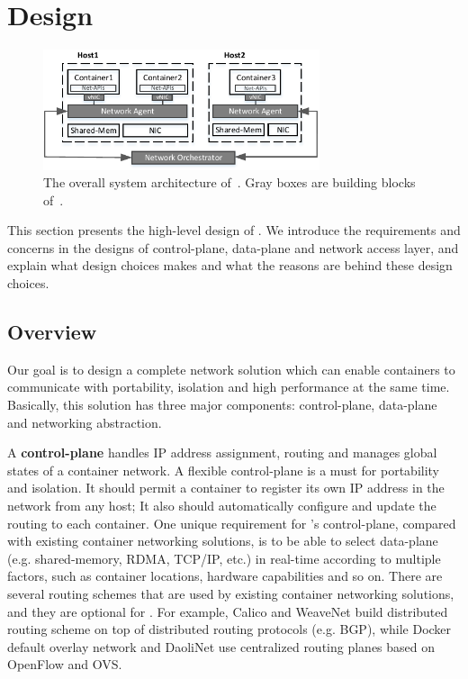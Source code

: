 \section{Design} \label{sec:design}

\begin{figure}[t!] 
     \centering 
     \includegraphics[width=3.2in]{figures/system-arch.pdf} 
    \caption{\label{fig:sysarch} The overall system architecture of~\sysname. Gray boxes are building blocks of~\sysname.} 
\end{figure} 

This section presents the high-level design of \sysname. We introduce
the requirements and concerns in the designs of control-plane, data-plane
and network access layer, and explain what design choices \sysname makes 
and what the reasons are behind these design choices.

\subsection{Overview}

Our goal is to design a complete network solution which can enable containers
to communicate with portability, isolation and high performance at the same time.
Basically, this solution has three major components: control-plane, data-plane 
and networking abstraction. 

A \textbf{control-plane} handles IP address assignment, routing and manages global states of a container network.
A flexible control-plane is a must for portability and isolation. 
It should permit a container to register its own IP address in the network
from any host; It also should automatically configure and update the routing 
to each container. One unique requirement for \sysname's control-plane,
compared with existing container networking solutions, is to be able to 
select data-plane (e.g. shared-memory, RDMA, TCP/IP, etc.) in real-time
according to multiple factors, such as container locations, hardware 
capabilities and so on. 
There are several routing schemes that are used by existing
container networking solutions, and they are optional for \sysname. 
For example, Calico and WeaveNet build distributed routing scheme on top of 
distributed routing protocols (e.g. BGP), while Docker default overlay network
and DaoliNet use centralized routing planes based on OpenFlow and OVS.

